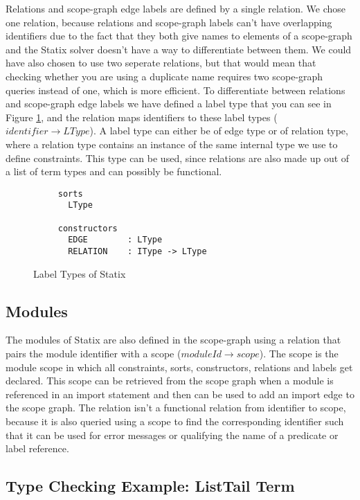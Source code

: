 Relations and scope-graph edge labels are defined by a single relation. We chose one relation, because relations and scope-graph labels can't have overlapping identifiers due to the fact that they both give names to elements of a scope-graph and the Statix solver doesn't have a way to differentiate between them. We could have also chosen to use two seperate relations, but that would mean that checking whether you are using a duplicate name requires two scope-graph queries instead of one, which is more efficient.
To differentiate between relations and scope-graph edge labels we have defined a label type that you can see in Figure \ref{fig:label-types}, and the relation maps identifiers to these label types (\(identifier \rightarrow LType \)). A label type can either be of edge type or of relation type, where a relation type contains an instance of the same internal type we use to define constraints. This type can be used, since relations are also made up out of a list of term types and can possibly be functional.

\begin{figure}
  \begin{lstlisting}
     sorts
       LType

     constructors
       EDGE        : LType
       RELATION    : IType -> LType
  \end{lstlisting}
  \caption{Label Types of Statix}
  \label{fig:label-types}
\end{figure}

\subsection{Modules}

The modules of Statix are also defined in the scope-graph using a relation that pairs the module identifier with a scope (\(moduleId \rightarrow scope\)). The scope is the module scope in which all constraints, sorts, constructors, relations and labels get declared. This scope can be retrieved from the scope graph when a module is referenced in an import statement and then can be used to add an import edge to the scope graph. The relation isn't a functional relation from identifier to scope, because it is also queried using a scope to find the corresponding identifier such that it can be used for error messages or qualifying the name of a predicate or label reference.

\subsection{Type Checking Example: ListTail Term}

